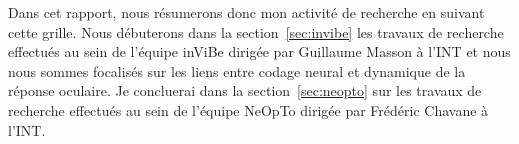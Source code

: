 Dans cet rapport, nous résumerons donc mon activité de recherche en suivant cette grille. Nous débuterons %
dans la section~\ref{sec:invibe} les travaux de recherche effectués au sein de l'équipe {\sc inViBe} dirigée par Guillaume Masson à l'INT et nous nous sommes focalisés sur les liens entre codage neural et dynamique de la réponse oculaire. %
Je concluerai dans la section~\ref{sec:neopto} sur les travaux de recherche effectués au sein de l'équipe {\sc NeOpTo} dirigée par Frédéric Chavane à l'INT.
